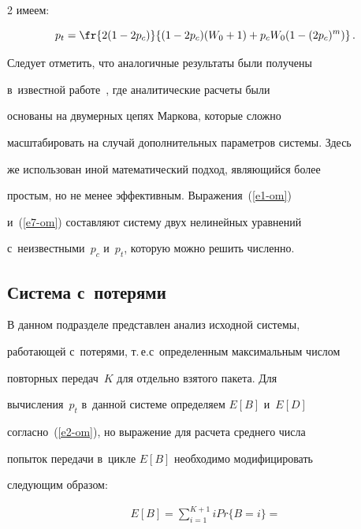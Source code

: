 \begin{multicols}{2}
имеем:


    \begin{equation}


    p_t= \fr{2(1-2p_c)} {(1-2p_c) (W_0+1) +p_c W_0 (1-(2p_c)^m)}\,.


    \label{e7-om}


    \end{equation}


    


    Следует отметить, что аналогичные результаты были получены 


в~известной работе~\cite{8-om}, где аналитические расчеты были 


основаны на двумерных цепях Маркова, которые сложно 


масштабировать на случай дополнительных параметров системы. Здесь 


же использован иной математический подход, яв\-ля\-ющий\-ся более 


простым, но не менее эффективным. Выражения~(\ref{e1-om})  


и~(\ref{e7-om}) составляют систему двух нелинейных уравнений 


с~неизвестными~$p_c$ и~$p_t$, которую можно решить численно. 


    


\subsection{Система с~потерями}


     


    В данном подразделе представлен анализ ис\-ходной системы, 


работающей с~потерями, т.\,е.\linebreak с~определенным максимальным числом 


повторных передач~$K$ для отдельно взятого пакета. Для 


вы\-чис\-ле\-ния~$p_t$ в~данной системе определяем $E[B]$ и~$E[D]$ 


согласно~(\ref{e2-om}), но выражение для расчета среднего числа 


попыток передачи в~цикле $E[B]$ необходимо модифицировать 


следующим образом:


    \begin{multline}


    E[B]= \sum\limits_{i=1}^{K+1} i Pr\{B=i\} = {}\\



\end{multline}
\end{multicols}
